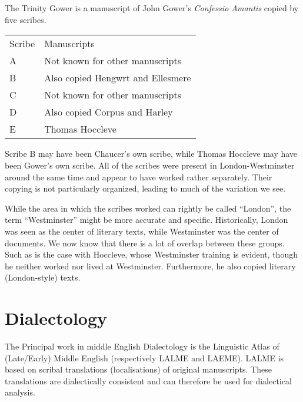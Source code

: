 \documentclass[12pt]{report}
\begin{document}
\chapter{}

The Trinity Gower is a manuscript of John Gower's \textit{Confessio Amantis}
copied by five scribes.

\begin{tabular}{l|l}
	Scribe & Manuscripts\\
	A & Not known for other manuscripts\\
	B & Also copied Hengwrt and Ellesmere\\
	C & Not known for other manuscripts\\
	D & Also copied Corpus and Harley\\
	E & Thomas Hoccleve\\
\end{tabular}

Scribe B may have been Chaucer's own scribe, while Thomas Hoccleve may have been
Gower's own scribe.  All of the scribes were present in London-Westminster
around the same time and appear to have worked rather separately. Their copying
is not particularly organized, leading to much of the variation we see.

While the area in which the scribes worked can rightly be called ``London'', the
term ``Westminster'' might be more accurate and specific. Historically, London
was seen as the center of literary texts, while Westminster was the center of
documents. We now know that there is a lot of overlap between these groups. Such
as is the case with Hoccleve, whose Westminster training is evident, though he
neither worked nor lived at Westminster. Furthermore, he also copied literary
(London-style) texts.

\chapter{Dialectology}

The Principal work in middle English Dialectology is the Linguistic Atlas of
(Late/Early) Middle English (respectively LALME and LAEME). LALME is based on
scribal translations (localisations) of original manuscripts. These
translations are dialectically consistent and can therefore be used for
dialectical analysis.
\end{document}
